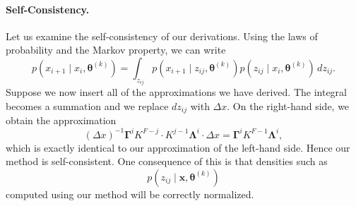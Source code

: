 \documentclass[12pt]{article}
\newcommand{\btheta}{\ensuremath{\boldsymbol{\theta}}}
\newcommand{\bLambda}{\ensuremath{\boldsymbol{\Lambda}}}
\newcommand{\bGamma}{\ensuremath{\boldsymbol{\Gamma}}}
\begin{document}
\paragraph{Self-Consistency.} Let us examine the self-consistency of our derivations.  Using the laws of probability and the Markov property, we can write
$$
p(x_{i+1} \mid x_i, \btheta^{(k)}) = \int_{z_{ij}} p(x_{i+1} \mid z_{ij}, \btheta^{(k)}) p( z_{ij} \mid x_i, \btheta^{(k)} ) \, dz_{ij}.
$$
Suppose we now insert all of the approximations we have derived.  The integral becomes a summation and we replace $dz_{ij}$ with $\Delta x$.  On the right-hand side, we obtain the approximation
$$
(\Delta x)^{-1} \bGamma^i K^{F - j} \cdot K^{j-1} \bLambda^i \cdot \Delta x = 
\bGamma^i K^{F-1} \bLambda^i,
$$
which is exactly identical to our approximation of the left-hand side.  Hence our method is self-consistent.  One consequence of this is that densities such as
$$
p(z_{ij} \mid \mathbf{x}, \btheta^{(k)})
$$
computed using our method will be correctly normalized.
\end{document}
